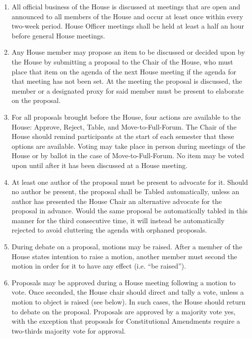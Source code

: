 \documentclass[letterpaper]{article}
\begin{document}
\begin{enumerate}
\begin{enumerate}
\begin{enumerate}
\item All official business of the House is discussed at meetings that are open and announced to all members of the House and occur at least once within every two-week period. House Officer meetings shall be held at least a half an hour before general House meetings.

\item Any House member may propose an item to be discussed or decided upon by the House by submitting a proposal to the Chair of the House, who must place that item on the agenda of the next House meeting if the agenda for that meeting has not been set. At the meeting the proposal is discussed, the member or a designated proxy for said member must be present to elaborate on the proposal.

\item For all proposals brought before the House, four actions are available to the House: Approve, Reject, Table, and Move-to-Full-Forum. The Chair of the House should remind participants at the start of each semester that these options are available. Voting may take place in person during meetings of the House or by ballot in the case of Move-to-Full-Forum. No item may be voted upon until after it has been discussed at a House meeting.

\item At least one author of the proposal must be present to advocate for it. Should no author be present, the proposal shall be Tabled automatically, unless an author has presented the House Chair an alternative advocate for the proposal in advance. Would the same proposal be automatically tabled in this manner for the third consecutive time, it will instead be automatically rejected to avoid cluttering the agenda with orphaned proposals.

\item During debate on a proposal, motions may be raised. After a member of the House states intention to raise a motion, another member must second the motion in order for it to have any effect (i.e. ``be raised'').

\item Proposals may be approved during a House meeting following a motion to vote. Once seconded, the House chair should direct and tally a vote, unless a motion to object is raised (see below). In such cases, the House should return to debate on the proposal. Proposals are approved by a majority vote yes, with the exception that proposals for Constitutional Amendments require a two-thirds majority vote for approval.


\end{enumerate}
\end{enumerate}
\end{enumerate}
\end{document}
